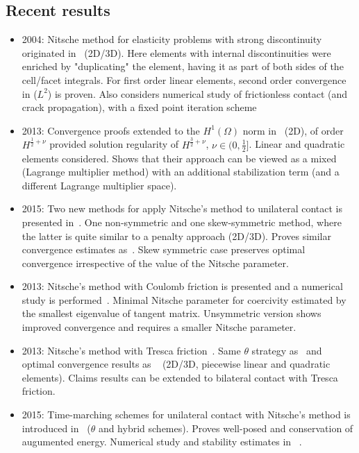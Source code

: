 \documentclass[12pt]{article}
\begin{document}
\subsection{Recent results}
\begin{itemize}
\item 2004: Nitsche method for elasticity problems with strong discontinuity originated in~\cite{HANSBO20043523} (2D/3D). 
Here elements with internal discontinuities were enriched by "duplicating" the element, having it as part of both sides of the cell/facet integrals.
For first order linear elements, second order convergence in ($L^2$) is proven. Also considers numerical study of frictionless contact (and crack propagation), with a fixed point iteration scheme
\item 2013: Convergence proofs extended to the $H^1(\Omega)$ norm in~\cite{choly2013unilateral} (2D), of order $H^{\frac{1}{2}+\nu}$ provided solution regularity of $H^{\frac{3}{2}+\nu}$, $\nu\in(0,\frac{1}{2}]$.
Linear and quadratic elements considered.
Shows that their approach can be viewed as a mixed (Lagrange multiplier method) with an additional stabilization term (and a different Lagrange multiplier space).
\item 2015: Two new methods for apply Nitsche's method to unilateral contact is presented in~\cite{chouly2015symm}.
One non-symmetric and one skew-symmetric method, where the latter is quite similar to a penalty approach (2D/3D). Proves similar convergence estimates as~\cite{choly2013unilateral}.
Skew symmetric case preserves optimal convergence irrespective of the value of the Nitsche parameter.
\item  2013: Nitsche's method with Coulomb friction is presented and a numerical study is performed~\cite{RENARD201338}. 
Minimal Nitsche parameter for coercivity estimated by the smallest eigenvalue of tangent matrix. Unsymmetric version shows improved convergence and requires a smaller Nitsche parameter.
\item 2013: Nitsche's method with Tresca friction~\cite{CHOULY2014TRESCA}. Same $\theta$ strategy as~\cite{chouly2015symm} and optimal convergence results as ~\cite{choly2013unilateral} (2D/3D, piecewise linear and quadratic elements). Claims results can be extended to bilateral contact with Tresca friction.
\item 2015: Time-marching schemes for unilateral contact with Nitsche's method is introduced in~\cite{chouly2015timedep} ($\theta$ and hybrid schemes). Proves well-posed and conservation of augumented energy. Numerical study and stability estimates in ~\cite{chouly2015timedep2}.

\end{itemize}
\end{document}

